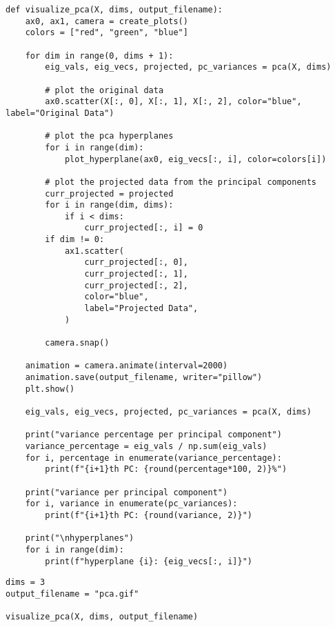 \documentclass[openany]{book}
\begin{document}
\begin{tcolorbox}
\tiny
\begin{verbatim}
def visualize_pca(X, dims, output_filename):
    ax0, ax1, camera = create_plots()
    colors = ["red", "green", "blue"]

    for dim in range(0, dims + 1):
        eig_vals, eig_vecs, projected, pc_variances = pca(X, dims)

        # plot the original data
        ax0.scatter(X[:, 0], X[:, 1], X[:, 2], color="blue", label="Original Data")

        # plot the pca hyperplanes
        for i in range(dim):
            plot_hyperplane(ax0, eig_vecs[:, i], color=colors[i])

        # plot the projected data from the principal components
        curr_projected = projected
        for i in range(dim, dims):
            if i < dims:
                curr_projected[:, i] = 0
        if dim != 0:
            ax1.scatter(
                curr_projected[:, 0],
                curr_projected[:, 1],
                curr_projected[:, 2],
                color="blue",
                label="Projected Data",
            )

        camera.snap()

    animation = camera.animate(interval=2000)
    animation.save(output_filename, writer="pillow")
    plt.show()

    eig_vals, eig_vecs, projected, pc_variances = pca(X, dims)

    print("variance percentage per principal component")
    variance_percentage = eig_vals / np.sum(eig_vals)
    for i, percentage in enumerate(variance_percentage):
        print(f"{i+1}th PC: {round(percentage*100, 2)}%")

    print("variance per principal component")
    for i, variance in enumerate(pc_variances):
        print(f"{i+1}th PC: {round(variance, 2)}")

    print("\nhyperplanes")
    for i in range(dim):
        print(f"hyperplane {i}: {eig_vecs[:, i]}")
\end{verbatim}
\end{tcolorbox}

\begin{tcolorbox}
\tiny
\begin{verbatim}
dims = 3
output_filename = "pca.gif"

visualize_pca(X, dims, output_filename)
\end{verbatim}
\end{tcolorbox}
\end{document}
